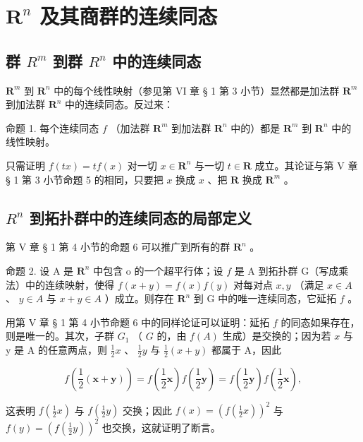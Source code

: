 \section{\texorpdfstring{\(\mathbf{R}^n\) 及其商群的连续同态}{R 的 n 次幂及其商群的连续同态}}

\subsection{\texorpdfstring{群 \(R^{m}\) 到群 \(R^{n}\) 中的连续同态}{群 R 的 m 次幂到群 R 的 n 次幂中的连续同态}}

\(\mathbf{R}^{m}\) 到 \(\mathbf{R}^{n}\) 中的每个线性映射（参见第 VI 章 § 1 第 3 小节）显然都是加法群 \(\mathbf{R}^{m}\) 到加法群 \(\mathbf{R}^{n}\) 中的连续同态。反过来：

命题 1. 每个连续同态 \(f\) （加法群 \(\mathbf{R}^m\) 到加法群 \(\mathbf{R}^n\) 中的）都是 \(\mathbf{R}^m\) 到 \(\mathbf{R}^n\) 中的线性映射。

只需证明 \(f(tx) = tf(x)\) 对一切 \(x \in \mathbf{R}^n\) 与一切 \(t \in \mathbf{R}\) 成立。其论证与第 V 章 § 1 第 3 小节命题 5 的相同，只要把 \(x\) 换成 \(x\) 、把 \(\mathbf{R}\) 换成 \(\mathbf{R}^m\) 。

\subsection{\texorpdfstring{\(R^{n}\) 到拓扑群中的连续同态的局部定义}{R 的 n 次幂到拓扑群中的连续同态的局部定义}}

第 V 章 § 1 第 4 小节的命题 6 可以推广到所有的群 \(\mathbf{R}^n\) 。

命题 2. 设 A 是 \(\mathbf{R}^n\) 中包含 o 的一个超平行体；设 \(f\) 是 A 到拓扑群 G（写成乘法）中的连续映射，使得 \(f(x + y) = f(x)f(y)\) 对每对点 \(x, y\) （满足 \(x \in A\) 、 \(y \in A\) 与 \(x + y \in A\) ）成立。则存在 \(\mathbf{R}^n\) 到 G 中的唯一连续同态，它延拓 \(f\) 。

用第 V 章 § 1 第 4 小节命题 6 中的同样论证可以证明：延拓 \(f\) 的同态如果存在，则是唯一的。其次，子群 \(G_1\) （ \(G\) 的，由 \(f(A)\) 生成）是交换的；因为若 \(x\) 与 y 是 A 的任意两点，则 \(\frac{1}{2}x\) 、 \(\frac{1}{2}y\) 与 \(\frac{1}{2}(x+y)\) 都属于 A，因此

\[
f \left(\frac {1}{2} (\boldsymbol {x} + \boldsymbol {y})\right) = f \left(\frac {1}{2} \boldsymbol {x}\right) f \left(\frac {1}{2} \boldsymbol {y}\right) = f \left(\frac {1}{2} \boldsymbol {y}\right) f \left(\frac {1}{2} \boldsymbol {x}\right),
\]

这表明 \(f(\frac{1}{2} x)\) 与 \(f(\frac{1}{2} y)\) 交换；因此 \(f(x) = (f(\frac{1}{2} x))^2\) 与 \(f(y) = (f(\frac{1}{2} y))^2\) 也交换，这就证明了断言。

